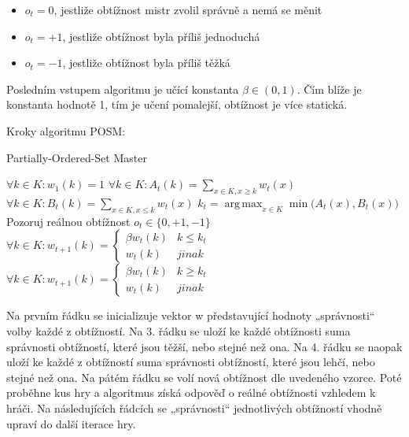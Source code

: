 \begin{itemize}
	\item $o_t=0$, jestliže obtížnost mistr zvolil správně a nemá se měnit
	\item $o_t=+1$, jestliže obtížnost byla příliš jednoduchá
	\item $o_t=-1$, jestliže obtížnost byla příliš těžká
\end{itemize}
	
Posledním vstupem algoritmu je učící konstanta $\beta\in(0,1)$. Čím blíže je konstanta hodnotě 1, tím je učení pomalejší, obtížnost je více statická.

Kroky algoritmu POSM:

\begin{algorithm}
\caption{Partially-Ordered-Set Master}
\label{posm}
\begin{algorithmic}[1]
\State $\forall k \in K : w_1(k) = 1$
	 \State $\forall k \in K : A_t(k) = \sum_{x \in K, x \geq k} w_t(x)$
	 \State $\forall k \in K : B_t(k) = \sum_{x \in K, x \leq k} w_t(x)$
	 \State $k_t = \operatorname{arg\,max}_{x \in K} \min({A_t(x), B_t(x))}$
	 \State Pozoruj reálnou obtížnost $o_t\in \{0,+1,-1\}$
	   \State $\forall k \in K : w_{t+1}(k) = 
		                                        \begin{cases}
																						   \beta w_t(k) & k \leq k_t \\
																							 w_t(k) & jinak
																						\end{cases}
						 $
   \EndIf
	   \State $\forall k \in K : w_{t+1}(k) = 
		                                        \begin{cases}
																						   \beta w_t(k) & k \geq k_t \\
																							 w_t(k) & jinak
																						\end{cases}
						 $
   \EndIf
\EndFor
\end{algorithmic}
\end{algorithm}

Na prvním řádku se inicializuje vektor w představující hodnoty „správnosti“ volby každé z obtížností. Na 3. řádku se uloží ke každé obtížnosti suma správnosti obtížností, které jsou těžší, nebo stejné než ona. Na 4. řádku se naopak uloží ke každé z obtížností suma správnosti obtížností, které jsou lehčí, nebo stejné než ona. Na pátém řádku se volí nová obtížnost dle uvedeného vzorce. Poté proběhne kus hry a algoritmus získá odpověď o reálné obtížnosti vzhledem k hráči. Na následujících řádcích se „správnosti“ jednotlivých obtížností vhodně upraví do další iterace hry.

